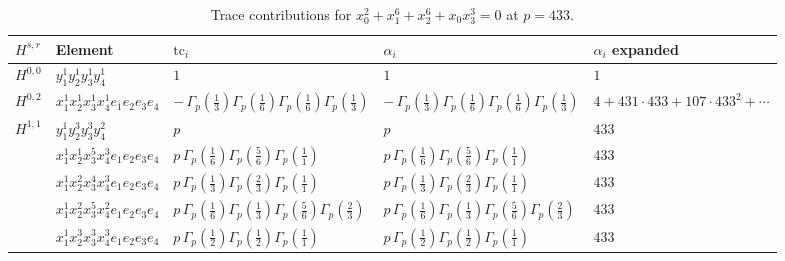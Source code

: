 \documentclass[11pt]{article}
\begin{document}
\begin{table}[ht]
\centering
\caption{Trace contributions for $x_0^{2} + x_1^{6} + x_2^{6} + x_0 x_3^{3} = 0$ at $p=433$.}\label{tab:deformed-4}
\renewcommand{\arraystretch}{1.1}
{\scriptsize
\begin{tabular}{@{}lllll@{}}
\toprule
$H^{s,r}$ & Element & $\mathrm{tc}_i$ & $\alpha_i$ & $\alpha_i$ expanded \\
\midrule
$H^{0,0}$ & $y_{1}^{1} y_{2}^{1} y_{3}^{1} y_{4}^{1}$ & $1$ & $1$ & $1$ \\
\midrule
$H^{0,2}$ & $x_{1}^{1} x_{2}^{1} x_{3}^{1} x_{4}^{1}  e_{1} e_{2} e_{3} e_{4}$ & $- \, \Gamma_p \left( \frac{1}{3} \right) \Gamma_p \left( \frac{1}{6} \right) \Gamma_p \left( \frac{1}{6} \right) \Gamma_p \left( \frac{1}{3} \right)$ & $- \, \Gamma_p \left( \frac{1}{3} \right) \Gamma_p \left( \frac{1}{6} \right) \Gamma_p \left( \frac{1}{6} \right) \Gamma_p \left( \frac{1}{3} \right)$ & $4{+}431{\cdot}433{+}107{\cdot}433^{2}{+}\cdots$ \\
\midrule
$H^{1,1}$ & $y_{1}^{1} y_{2}^{3} y_{3}^{3} y_{4}^{2}$ & $p \,$ & $p \,$ & $433$ \\
 & $x_{1}^{1} x_{2}^{1} x_{3}^{5} x_{4}^{3}  e_{1} e_{2} e_{3} e_{4}$ & $p \, \Gamma_p \left( \frac{1}{6} \right) \Gamma_p \left( \frac{5}{6} \right) \Gamma_p \left( \frac{1}{1} \right)$ & $p \, \Gamma_p \left( \frac{1}{6} \right) \Gamma_p \left( \frac{5}{6} \right) \Gamma_p \left( \frac{1}{1} \right)$ & $433$ \\
 & $x_{1}^{1} x_{2}^{2} x_{3}^{4} x_{4}^{3}  e_{1} e_{2} e_{3} e_{4}$ & $p \, \Gamma_p \left( \frac{1}{3} \right) \Gamma_p \left( \frac{2}{3} \right) \Gamma_p \left( \frac{1}{1} \right)$ & $p \, \Gamma_p \left( \frac{1}{3} \right) \Gamma_p \left( \frac{2}{3} \right) \Gamma_p \left( \frac{1}{1} \right)$ & $433$ \\
 & $x_{1}^{1} x_{2}^{2} x_{3}^{5} x_{4}^{2}  e_{1} e_{2} e_{3} e_{4}$ & $p \, \Gamma_p \left( \frac{1}{6} \right) \Gamma_p \left( \frac{1}{3} \right) \Gamma_p \left( \frac{5}{6} \right) \Gamma_p \left( \frac{2}{3} \right)$ & $p \, \Gamma_p \left( \frac{1}{6} \right) \Gamma_p \left( \frac{1}{3} \right) \Gamma_p \left( \frac{5}{6} \right) \Gamma_p \left( \frac{2}{3} \right)$ & $433$ \\
 & $x_{1}^{1} x_{2}^{3} x_{3}^{3} x_{4}^{3}  e_{1} e_{2} e_{3} e_{4}$ & $p \, \Gamma_p \left( \frac{1}{2} \right) \Gamma_p \left( \frac{1}{2} \right) \Gamma_p \left( \frac{1}{1} \right)$ & $p \, \Gamma_p \left( \frac{1}{2} \right) \Gamma_p \left( \frac{1}{2} \right) \Gamma_p \left( \frac{1}{1} \right)$ & $433$ \\

\end{tabular}}
\end{table}
\end{document}
